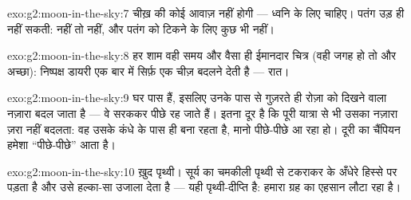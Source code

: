 \begin{solution}{exo:g2:moon-in-the-sky:7}
चीख़ की कोई आवाज़ नहीं होगी --- ध्वनि के लिए  चाहिए। पतंग उड़ ही
नहीं सकती:  नहीं तो  नहीं, और पतंग को टिकने के लिए कुछ भी
नहीं।
\end{solution}

\begin{solution}{exo:g2:moon-in-the-sky:8}
हर शाम वही समय और वैसा ही ईमानदार चित्र (वही जगह हो तो और अच्छा):
निष्पक्ष डायरी एक बार में सिर्फ़ एक चीज़ बदलने देती है --- रात।
\end{solution}

\begin{solution}{exo:g2:moon-in-the-sky:9}
घर पास हैं, इसलिए उनके पास से गुज़रते ही रोज़ा को दिखने वाला नज़ारा
बदल जाता है --- वे सरककर पीछे रह जाते हैं।  इतना दूर है कि
पूरी यात्रा से भी उसका नज़ारा ज़रा नहीं बदलता: वह उसके कंधे के पास
ही बना रहता है, मानो पीछे-पीछे आ रहा हो। दूरी का चैंपियन हमेशा
``पीछे-पीछे'' आता है।
\end{solution}

\begin{solution}{exo:g2:moon-in-the-sky:10}
ख़ुद पृथ्वी। सूर्य का  चमकीली पृथ्वी से टकराकर  के
अँधेरे हिस्से पर पड़ता है और उसे हल्का-सा उजाला देता है --- यही
पृथ्वी-दीप्ति है: हमारा ग्रह  का एहसान लौटा रहा है।
\end{solution}
